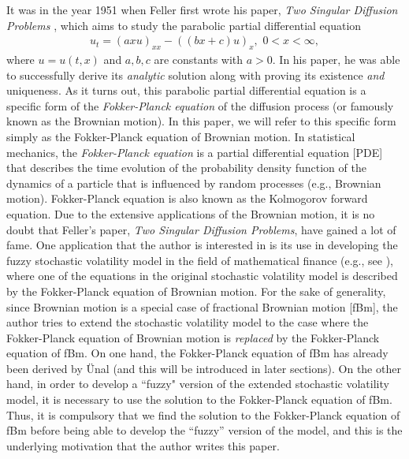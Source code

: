 \documentclass[preprint, 12pt]{elsarticle}
\numberwithin{equation}{section}
\theoremstyle{plain}
\theoremstyle{remark}
\begin{document}
It was in the year 1951 when Feller first wrote his paper, \textit{Two Singular Diffusion Problems} \citep{Feller}, which aims to study the parabolic partial differential equation
\begin{eqnarray}
  u_t = (a x u)_{x x} - ((b x + c) u)_x \label{FellerPDE}, \,\, 0 < x < \infty, 
\end{eqnarray}
where $u = u (t, x)$ and $a, b, c$ are constants with $a > 0$. In his paper, he was able to successfully derive its \emph{analytic} solution along with proving its existence \emph{and} uniqueness. As it turns out, this parabolic partial differential equation is a specific form of the \textit{Fokker-Planck equation} of the diffusion process (or famously known as the Brownian motion). In this paper, we will refer to this specific form simply as the Fokker-Planck equation of Brownian motion. In statistical mechanics, the \textit{Fokker-Planck equation} is a partial differential equation [PDE] that describes the time evolution of the probability density function of the dynamics of a particle that is influenced by random processes (e.g., Brownian motion). Fokker-Planck equation is also known as the Kolmogorov forward equation. Due to the extensive applications of the Brownian motion, it is no doubt that Feller's paper, \textit{Two Singular Diffusion Problems}, have gained a lot of fame. One application that the author is interested in is its use in developing the fuzzy stochastic volatility model in the field of mathematical finance (e.g., see \citep{1}), where one of the equations in the original stochastic volatility model is described by the Fokker-Planck equation of Brownian motion. For the sake of generality, since Brownian motion is a special case of fractional Brownian motion [fBm], the author tries to extend the stochastic volatility model to the case where the Fokker-Planck equation of Brownian motion is {\emph{replaced}} by the Fokker-Planck equation of fBm. On one hand, the Fokker-Planck equation of fBm has already been derived by {\" U}nal \citep{Unal} (and this will be introduced in later sections). On the other hand, in order to develop a ``fuzzy" version of the extended stochastic volatility model, it is necessary to use the solution to the Fokker-Planck equation of fBm. Thus, it is compulsory that we find the solution to the Fokker-Planck equation of fBm before being able to develop the ``fuzzy'' version of the model, and this is the underlying motivation that the author writes this paper.
\end{document}
